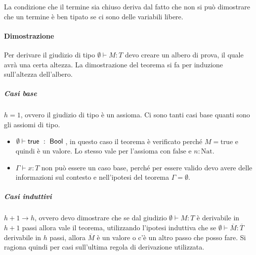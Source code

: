 \noindent La condizione che il termine sia chiuso deriva dal fatto che non si può dimostrare che un termine è ben tipato se ci sono delle variabili libere.

\paragraph{Dimostrazione}

Per derivare il giudizio di tipo $\emptyset \vdash M : T$ devo creare un albero di prova, il quale avrà una certa altezza. La dimostrazione del teorema si fa per induzione sull'altezza dell'albero.

\subparagraph{Casi base} $h = 1$, ovvero il giudizio di tipo è un assioma. Ci sono tanti casi base quanti sono gli assiomi di tipo.

\begin{itemize}
	\item $\emptyset \vdash \text{true } : \Bool$, in questo caso il teorema è verificato perché $M = \text{true}$ e quindi è un valore. Lo stesso vale per l'assioma con $\text{false}$ e $n :\text{Nat}$.
	\item $\Gamma \vdash x : T$ non può essere un caso base, perché per essere valido devo avere delle informazioni sul contesto e nell'ipotesi del teorema $\Gamma = \emptyset$.
\end{itemize} 

\subparagraph{Casi induttivi} $h+1 \rightarrow h$, ovvero devo dimostrare che se dal giudizio $\emptyset \vdash M : T$ è derivabile in $h+1$ passi allora vale il teorema, utilizzando l'ipotesi induttiva che se $\emptyset \vdash \overline{M} : \overline{T}$ derivabile in $h$ passi, allora $\overline{M}$ è un valore o c'è un altro passo che posso fare.
Si ragiona quindi per casi sull'ultima regola di derivazione utilizzata.

